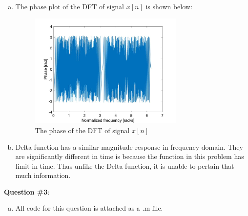 \documentclass[a4paper]{article}
\begin{document}
\begin{spacing}{2.0}
\begin{enumerate}[(a)]
\item The phase plot of the DFT of signal $x[n]$ is shown below:
\begin{figure}[H]
\centering
\includegraphics[width=3in]{Q2parte.jpg}
\caption{The phase of the DFT of signal $x[n]$}
\end{figure}

\item Delta function has a similar magnitude response in frequency domain. They are significantly different in time is because the function in this problem has limit in time. Thus unlike the Delta function, it is unable to pertain that much information.
\end{enumerate}

\Large\textbf{Question \#3}:
\normalsize
\begin{enumerate}[(a)]
\item All code for this question is attached as a .m file.


\end{enumerate}
\end{spacing}
\end{document}
